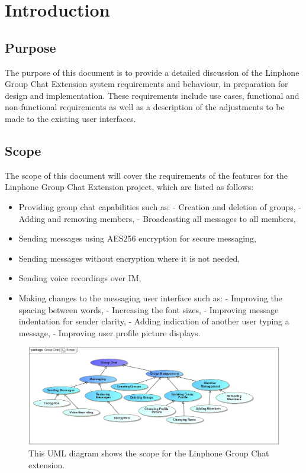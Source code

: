 \documentclass[11pt]{article}
\begin{document}
\newpage
\section{Introduction}

\subsection{Purpose}
The purpose of this document is to provide a detailed discussion of the Linphone Group Chat Extension system requirements and behaviour, in preparation for design and implementation. These requirements include use cases, functional and non-functional requirements as well as a description of the adjustments to be made to the existing user interfaces.
\subsection{Scope}
The scope of this document will cover the requirements of the features for the Linphone Group Chat Extension project, which are listed as follows:
\begin{itemize}
\item Providing group chat capabilities such as:
\subitem  - Creation and deletion of groups,
\subitem  - Adding and removing members,
\subitem  - Broadcasting all messages to all members,
\item Sending messages using AES256 encryption for secure messaging,
\item Sending messages without encryption where it is not needed,
\item Sending voice recordings over IM,
\item Making changes to the messaging user interface such as:
\subitem  - Improving the spacing between words,
\subitem  - Increasing the font sizes,
\subitem  - Improving message indentation for sender clarity,
\subitem  - Adding indication of another user typing a message,
\subitem  - Improving user profile picture displays.
\end{itemize}
\begin{figure}[H]
\centering
\includegraphics[width=5in]{./images/scope_master.png}
\caption[Group Chat Extension Scope]{This UML diagram shows the scope for the Linphone Group Chat extension.}
\label{figure-scope-master}
\end{figure}
\end{document}
